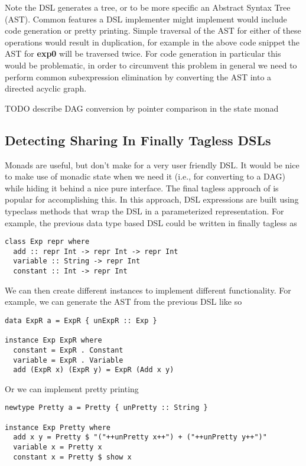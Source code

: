\documentclass[runningheads]{llncs}
\begin{document}
Note the DSL generates a tree, or to be more specific an Abstract Syntax Tree
(AST). Common features a DSL implementer might implement would include code
generation or pretty printing. Simple traversal of the AST for either of these
operations would result in duplication, for example in the above code snippet
the AST for {\bf exp0} will be traversed twice. For code generation in
particular this would be problematic, in order to circumvent this problem in
general we need to perform common subexpression elimination by converting the
AST into a directed acyclic graph. %

TODO describe DAG conversion by pointer comparison in the state monad

\subsection{Detecting Sharing In Finally Tagless DSLs}

Monads are useful, but don't make for a very user friendly DSL. It would be nice
to make use of monadic state when we need it (i.e., for converting to a DAG)
while hiding it behind a nice pure interface. The final tagless approach of
\cite{carette:finallytagless} is popular for accomplishing this. In this
approach, DSL expressions are built using typeclass methods that wrap the DSL in
a parameterized representation. For example, the previous data type based DSL
could be written in finally tagless as

\begin{verbatim}
class Exp repr where
  add :: repr Int -> repr Int -> repr Int
  variable :: String -> repr Int
  constant :: Int -> repr Int
\end{verbatim}

We can then create different instances to implement different functionality.
For example, we can generate the AST from the previous DSL like so
\begin{verbatim}
data ExpR a = ExpR { unExpR :: Exp }

instance Exp ExpR where
  constant = ExpR . Constant
  variable = ExpR . Variable
  add (ExpR x) (ExpR y) = ExpR (Add x y)
\end{verbatim}

Or we can implement pretty printing
\begin{verbatim}
newtype Pretty a = Pretty { unPretty :: String }

instance Exp Pretty where
  add x y = Pretty $ "("++unPretty x++") + ("++unPretty y++")"
  variable x = Pretty x
  constant x = Pretty $ show x
\end{verbatim}
\end{document}
